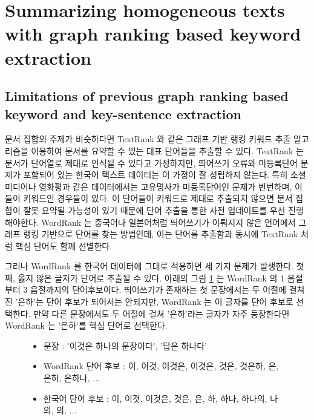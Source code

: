 \documentclass[11pt]{article}
\begin{document}
\vspace{3cm}


\section{Summarizing homogeneous texts with graph ranking based keyword extraction}

\subsection{Limitations of previous graph ranking based keyword and key-sentence extraction}

문서 집합의 주제가 비슷하다면 TextRank \citep{mihalcea2004textrank}와 같은 그래프 기반 랭킹 키워드 추출 알고리즘을 이용하여 문서를 요약할 수 있는 대표 단어들을 추출할 수 있다.
TextRank 는 문서가 단어열로 제대로 인식될 수 있다고 가정하지만, 띄어쓰기 오류와 미등록단어 문제가 포함되어 있는 한국어 텍스트 데이터는 이 가정이 잘 성립하지 않는다.
특히 소셜미디어나 영화평과 같은 데이터에서는 고유명사가 미등록단어인 문제가 빈번하며, 이들이 키워드인 경우들이 있다.
이 단어들이 키워드로 제대로 추출되지 않으면 문서 집합이 잘못 요약될 가능성이 있기 때문에 단어 추출을 통한 사전 업데이트를 우선 진행해야한다.
WordRank \citep{chen2011simple} 는 중국어나 일본어처럼 띄어쓰기가 이뤄지지 않은 언어에서 그래프 랭킹 기반으로 단어를 찾는 방법인데, 이는 단어를 추출함과 동시에 TextRank 처럼 핵심 단어도 함께 선별한다.

그러나 WordRank 를 한국어 데이터에 그대로 적용하면 세 가지 문제가 발생한다.
첫째, 옳지 않은 글자가 단어로 추출될 수 있다.
아래의 그림 \ref{fig:krwordrank_candidates} 는 WordRank 의 1 음절부터 3 음절까지의 단어후보이다.
띄어쓰기가 존재하는 첫 문장에서는 두 어절에 걸쳐진 '은하'는 단어 후보가 되어서는 안되지만, WordRank 는 이 글자를 단어 후보로 선택한다.
만약 다른 문장에서도 두 어절에 걸쳐 '은하'라는 글자가 자주 등장한다면 WordRank 는 '은하'를 핵심 단어로 선택한다.

\begin{figure}
\label{fig:krwordrank_candidates}
\begin{itemize}[noitemsep]
  \item 문장 : '이것은 하나의 문장이다', '답은 하나다'
  \item WordRank 단어 후보 : 이, 이것, 이것은, 이것은, 것은, 것은하, 은, 은하, 은하나, ...
  \item 한국어 단어 후보 : 이, 이것, 이것은, 것은, 은, 하, 하나, 하나의, 나의, 의, ...
\end{itemize}
\end{figure}
\end{document}

